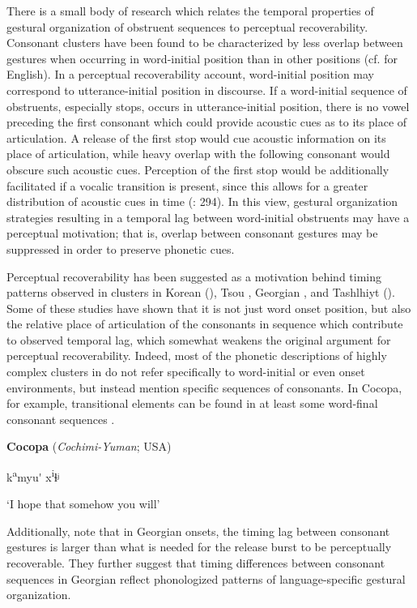   There is a small body of research which relates the temporal properties of gestural organization of obstruent sequences to perceptual recoverability. Consonant clusters have been found to be characterized by less overlap between gestures when occurring in word-initial position than in other positions (cf. \citealt{Byrd1996a} for English). In a perceptual recoverability account, word-initial position may correspond to utterance-initial position in discourse. If a word-initial sequence of obstruents, especially stops, occurs in utterance-initial position, there is no vowel preceding the first consonant which could provide acoustic cues as to its place of articulation. A release of the first stop would cue acoustic information on its place of articulation, while heavy overlap with the following consonant would obscure such acoustic cues. Perception of the first stop would be additionally facilitated if a vocalic transition is present, since this allows for a greater distribution of acoustic cues in time (\citealt{RidouaneFougeron2011}: 294). In this view, gestural organization strategies resulting in a temporal lag between word-initial obstruents may have a perceptual motivation; that is, overlap between consonant gestures may be suppressed in order to preserve phonetic cues.

  Perceptual recoverability has been suggested as a motivation behind timing patterns observed in clusters in Korean (\citealt{SilvermanJun1994}), Tsou \citep{Wright1996}, Georgian \citep{ChitoranEtAl2002}, and Tashlhiyt (\citealt{RidouaneFougeron2011}). Some of these studies have shown that it is not just word onset position, but also the relative place of articulation of the consonants in sequence which contribute to observed temporal lag, which somewhat weakens the original argument for perceptual recoverability. Indeed, most of the phonetic descriptions of highly complex clusters in  do not refer specifically to word-initial or even onset environments, but instead mention specific sequences of consonants. In Cocopa, for example, transitional elements can be found in at least some word-final consonant sequences .

\ea\label{ex:(8.9)}
  \textbf{Cocopa} (\textit{Cochimi-Yuman}; USA)

k\textsuperscript{a}myu\'{} x\textsuperscript{i}ɬʲ

\glt ‘I hope that somehow you will’

\citep[47]{Crawford1966}
\z

Additionally, \citet{ChitoranCohn2009} note that in Georgian onsets, the timing lag between consonant gestures is larger than what is needed for the release burst to be perceptually recoverable. They further suggest that timing differences between consonant sequences in Georgian reflect phonologized patterns of language-specific gestural organization.

